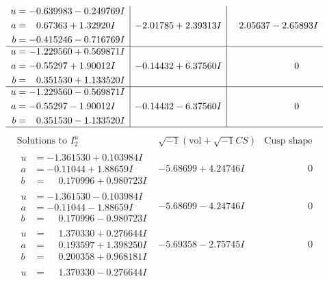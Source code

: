 \documentclass[1p]{elsarticle_modified}
\theoremstyle{definition}
\newcommand{\I}{\sqrt{-1}}
\begin{document}
$$\begin{array}{c|c|c}
\begin{aligned}
u &= -0.639983 - 0.249769 I \\
a &= \phantom{-}0.67363 + 1.32920 I \\
b &= -0.415246 - 0.716769 I\end{aligned}
 & -2.01785 + 2.39313 I & \phantom{-}2.05637 - 2.65893 I \\ \hline\begin{aligned}
u &= -1.229560 + 0.569871 I \\
a &= -0.55297 + 1.90012 I \\
b &= \phantom{-}0.351530 + 1.133520 I\end{aligned}
 & -0.14432 + 6.37560 I & \phantom{-0.000000 } 0 \\ \hline\begin{aligned}
u &= -1.229560 - 0.569871 I \\
a &= -0.55297 - 1.90012 I \\
b &= \phantom{-}0.351530 - 1.133520 I\end{aligned}
 & -0.14432 - 6.37560 I & \phantom{-0.000000 } 0\\
 \hline 
 \end{array}$$\newpage$$\begin{array}{c|c|c}  
\text{Solutions to }I^u_{2}& \I (\text{vol} + \sqrt{-1}CS) & \text{Cusp shape}\\
 \hline 
\begin{aligned}
u &= -1.361530 + 0.103984 I \\
a &= -0.11044 + 1.88659 I \\
b &= \phantom{-}0.170996 + 0.980723 I\end{aligned}
 & -5.68699 + 4.24746 I & \phantom{-0.000000 } 0 \\ \hline\begin{aligned}
u &= -1.361530 - 0.103984 I \\
a &= -0.11044 - 1.88659 I \\
b &= \phantom{-}0.170996 - 0.980723 I\end{aligned}
 & -5.68699 - 4.24746 I & \phantom{-0.000000 } 0 \\ \hline\begin{aligned}
u &= \phantom{-}1.370330 + 0.276644 I \\
a &= \phantom{-}0.193597 + 1.398250 I \\
b &= \phantom{-}0.200358 + 0.968181 I\end{aligned}
 & -5.69358 - 2.75745 I & \phantom{-0.000000 } 0 \\ \hline\begin{aligned}
u &= \phantom{-}1.370330 - 0.276644 I \\

\end{aligned}
\end{array}$$
\end{document}
